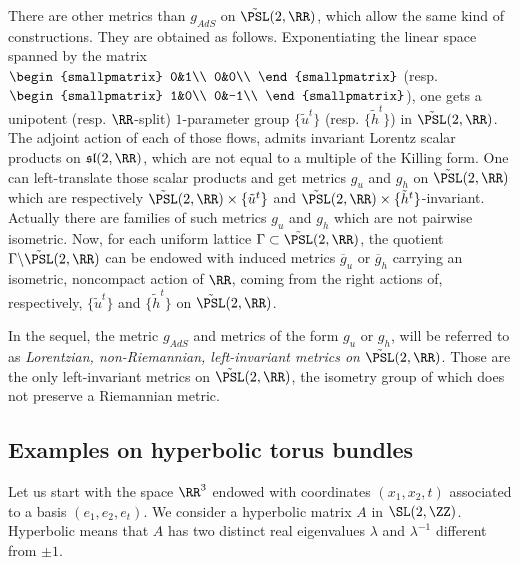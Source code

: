 There are other metrics than $g_{AdS}$ on $\tilde{\PSL}(2,\RR)$, which allow the same kind of constructions. They are obtained as follows. Exponentiating the linear space spanned by the matrix 
$\begin{smallpmatrix}
0&1\\
0&0\\
\end{smallpmatrix}$
(resp. $
\begin{smallpmatrix}
1&0\\
0&-1\\
\end{smallpmatrix}$), one gets a unipotent (resp. $\RR$-split) $1$-parameter group $\{\tilde{u}^t\}$ (resp. $\{ \tilde{h}^t \}$) in $\tilde{\PSL}(2,\RR)$. The adjoint action of each of those flows, admits invariant Lorentz scalar products on $\mathfrak{sl}(2,\RR)$, which are not equal to a multiple of the Killing form. One can left-translate those scalar products and get metrics $g_u$ and $g_h$ on $\tilde{\PSL}(2,\RR)$ which are respectively $\tilde{\PSL}(2,\RR)
\times \{\tilde{u}^t\}$ and $\tilde{\PSL}(2,\RR)
\times \{\tilde{h}^t\}$-invariant. Actually there are families of such metrics $g_u$ and $g_h$ which are not pairwise isometric. Now, for each uniform lattice $\Gamma \subset \tilde{\PSL}(2,\RR)$, the quotient $\Gamma \backslash \tilde{\PSL}(2,\RR)$ can be endowed with induced metrics $\overline{g}_u$ or $\overline{g}_h$ carrying an isometric, noncompact action of $\RR$, coming from the right actions of, respectively, $\{\tilde{u}^t\}$ and $\{\tilde{h}^t\}$ on $\tilde{\PSL}(2,\RR)$.

In the sequel, the metric $g_{AdS}$ and metrics of the form $g_u$ or $g_h$, will be referred to as \emph{Lorentzian, non-Riemannian, left-invariant metrics on} $\tilde{\PSL}(2,\RR)$. Those are the only left-invariant metrics on $\tilde{\PSL}(2,\RR)$, the isometry group of which does not preserve a Riemannian metric.



\subsection{Examples on hyperbolic torus bundles}\label{sec.exempleshyperboliques}


Let us start with the space $\RR^3$ endowed with coordinates $(x_1,x_2,t)$ associated to a basis $(e_1,e_2,e_t)$. We consider a hyperbolic matrix $A$ in $\SL(2,\ZZ)$. Hyperbolic means that $A$ has two distinct real eigenvalues $\lambda$ and $\lambda^{-1}$ different from $\pm 1$.



